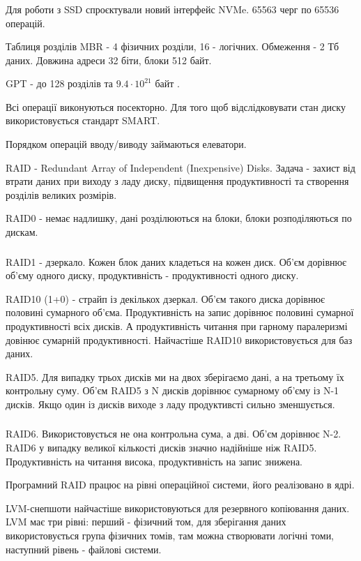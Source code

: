 \documentclass[t]{beamer}  %
\begin{document}
\begin{frame}
 	\frametitle{\insertsection} 
 	\framesubtitle{\insertsubsection}
Для роботи з SSD спроєктували новий інтерфейс NVMe. 65563 черг по 65536 операцій.

Таблиця розділів MBR - 4 фізичних розділи, 16 - логічних. Обмеження - 2 Тб даних. Довжина адреси 32 біти, блоки 512 байт.

GPT - до 128 розділів та $9.4\cdot 10^{21}$ байт .

Всі операції виконуються посекторно. Для того щоб відслідковувати стан диску використовується стандарт SMART.

Порядком операцій вводу/виводу займаються елеватори.

RAID - Redundant Array of Independent (Inexpensive) Disks. Задача - захист від втрати даних при виходу з ладу диску, підвищення продуктивності та створення розділів великих розмірів.

RAID0 - немає надлишку, дані розділюються  на блоки, блоки розподіляються по дискам.
\end{frame}

\begin{frame}
 	\frametitle{\insertsection} 
 	\framesubtitle{\insertsubsection}
RAID1 - дзеркало. Кожен блок даних кладеться на кожен диск. Об'єм дорівнює об'єму одного диску, продуктивність - продуктивності одного диску.

RAID10 (1+0) - страйп із декількох дзеркал. Об'єм такого диска дорівнює половині сумарного об'єма. Продуктивність на запис дорівнює половині сумарної продуктивності всіх дисків. А продуктивність читання при гарному паралеризмі довінює сумарній продуктивності. Найчастіше RAID10 використовується для баз даних.

RAID5. Для випадку трьох дисків ми на двох зберігаємо дані, а на третьому їх контрольну суму. Об'єм RAID5 з N дисків дорівнює сумарному об'єму із N-1 дисків. Якщо один із дисків виходе з ладу продуктивсті сильно зменшується.
\end{frame}

\begin{frame}
 	\frametitle{\insertsection} 
 	\framesubtitle{\insertsubsection}
RAID6. Використовується не она контрольна сума, а дві. Об'єм дорівнює N-2. RAID6 у випадку великої кількості дисків значно надійніше ніж RAID5. Продуктивність на читання висока, продуктивність на запис знижена.

Програмний RAID працює на рівні операційної системи, його реалізовано в ядрі.

LVM-снепшоти найчастіше використовуються для  резервного копіювання даних. LVM має три рівні: перший - фізичний том, для зберігання даних використовується група фізичних томів, там можна створювати логічні томи, наступний рівень - файлові системи.
\end{frame}
\end{document}
